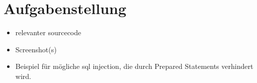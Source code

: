
\section{Aufgabenstellung}
\begin{itemize}
	\item relevanter sourcecode
	\item Screenshot(s)
	\item Beispiel für mögliche sql injection, die durch Prepared Statements verhindert wird.
\end{itemize}
